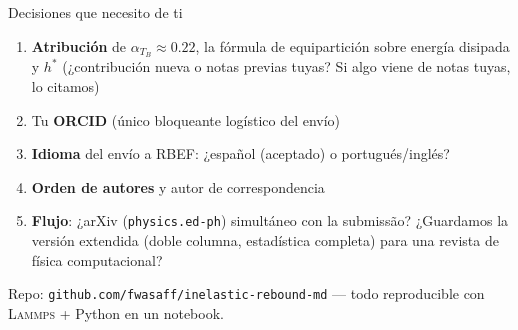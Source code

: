 \documentclass[11pt,aspectratio=169]{beamer}
\newcommand{\lammps}{\textsc{Lammps}}
\begin{document}
\begin{frame}{Decisiones que necesito de ti}
\begin{enumerate}
    \item \textbf{Atribución} de $\alpha_{T_B}\approx0.22$, la fórmula de
    equipartición sobre energía disipada y $h^*$ (¿contribución nueva o
    notas previas tuyas? Si algo viene de notas tuyas, lo citamos)
    \item Tu \textbf{ORCID} (único bloqueante logístico del envío)
    \item \textbf{Idioma} del envío a RBEF: ¿español (aceptado) o
    portugués/inglés?
    \item \textbf{Orden de autores} y autor de correspondencia
    \item \textbf{Flujo}: ¿arXiv (\texttt{physics.ed-ph}) simultáneo con la
    submissão? ¿Guardamos la versión extendida (doble columna, estadística
    completa) para una revista de física computacional?
\end{enumerate}
\bigskip
\centering
\footnotesize Repo: \texttt{github.com/fwasaff/inelastic-rebound-md}
--- todo reproducible con \lammps{} + Python en un notebook.
\end{frame}
\end{document}
